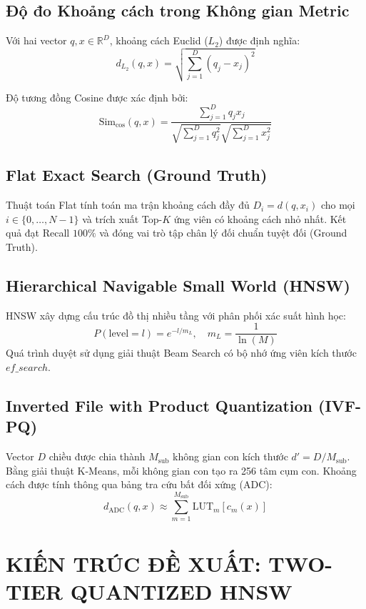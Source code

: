 \documentclass[12pt,a4paper]{article}
\begin{document}
\subsection{Độ đo Khoảng cách trong Không gian Metric}
Với hai vector $q, x \in \mathbb{R}^D$, khoảng cách Euclid ($L_2$) được định nghĩa:
\begin{equation}
d_{L_2}(q, x) = \sqrt{\sum_{j=1}^D (q_j - x_j)^2}
\end{equation}

Độ tương đồng Cosine được xác định bởi:
\begin{equation}
\text{Sim}_{\cos}(q, x) = \frac{\sum_{j=1}^D q_j x_j}{\sqrt{\sum_{j=1}^D q_j^2} \sqrt{\sum_{j=1}^D x_j^2}}
\end{equation}

\subsection{Flat Exact Search (Ground Truth)}
Thuật toán Flat tính toán ma trận khoảng cách đầy đủ $D_i = d(q, x_i)$ cho mọi $i \in \{0, \dots, N-1\}$ và trích xuất Top-$K$ ứng viên có khoảng cách nhỏ nhất. Kết quả đạt Recall $100\%$ và đóng vai trò tập chân lý đối chuẩn tuyệt đối (Ground Truth).

\subsection{Hierarchical Navigable Small World (HNSW)}
HNSW xây dựng cấu trúc đồ thị nhiều tầng với phân phối xác suất hình học:
\begin{equation}
P(\text{level} = l) = e^{-l / m_L}, \quad m_L = \frac{1}{\ln(M)}
\end{equation}
Quá trình duyệt sử dụng giải thuật Beam Search có bộ nhớ ứng viên kích thước $ef\_search$.

\subsection{Inverted File with Product Quantization (IVF-PQ)}
Vector $D$ chiều được chia thành $M_{\text{sub}}$ không gian con kích thước $d' = D / M_{\text{sub}}$. Bằng giải thuật K-Means, mỗi không gian con tạo ra 256 tâm cụm con. Khoảng cách được tính thông qua bảng tra cứu bất đối xứng (ADC):
\begin{equation}
d_{\text{ADC}}(q, x) \approx \sum_{m=1}^{M_{\text{sub}}} \text{LUT}_m[c_m(x)]
\end{equation}

\section{KIẾN TRÚC ĐỀ XUẤT: TWO-TIER QUANTIZED HNSW}
\end{document}
